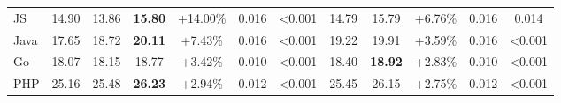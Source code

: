 \begin{table*}[h]
{\begin{tabular}{lccccccccccc}
JS                                                                                        & 14.90                                                                                  & 13.86                                                                                    & \textbf{15.80                                 } & +14.00\%                         & 0.016 & \textless{}0.001                                                                      & 14.79                       & 15.79                                     & +6.76\%                          & 0.016                                                                          & 0.014                                                                                 \\
Java                                                                                      & 17.65                                                                                  & 18.72                                                                                    & \textbf{20.11                                 } & +7.43\%                          & 0.016 & \textless{}0.001                                                                      & 19.22                       & 19.91                                     & +3.59\%                          & 0.016                                                                          & \textless{}0.001                                                                      \\
Go                                                                                        & 18.07                                                                                  & 18.15                                                                                    & 18.77                                  & +3.42\%                          & 0.010 & \textless{}0.001                                                                      & 18.40                       & \textbf{18.92 }                                    & +2.83\%                          & 0.010                                                                          & \textless{}0.001                                                                      \\
PHP                                                                                       & 25.16                                                                                  & 25.48                                                                                    & \textbf{26.23                                 } & +2.94\%                          & 0.012 & \textless{}0.001                                                                      & 25.45                       & 26.15                                     & +2.75\%                          & 0.012                                                                          & \textless{}0.001                                                                      \\

\end{tabular}}
\end{table*}
